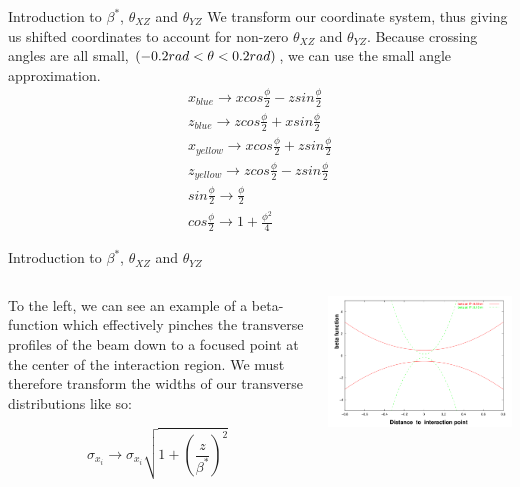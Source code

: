 \begin{frame}{Introduction to $\beta^{*}$,  $\theta_{XZ}$ and $\theta_{YZ}$}
We transform our coordinate system, thus giving us shifted coordinates to
account for non-zero $\theta_{XZ}$ and $\theta_{YZ}$. Because crossing angles
are all small, $\nobreak(-0.2 rad < \theta < 0.2 rad)$, we can use the small angle
approximation.
\begin{gather}
\label{eq:transformations}
x_{blue}   \rightarrow x cos \frac{\phi}{2} - z sin \frac{\phi}{2} \\
z_{blue}   \rightarrow z cos \frac{\phi}{2} + x sin \frac{\phi}{2} \\
x_{yellow} \rightarrow x cos \frac{\phi}{2} + z sin \frac{\phi}{2} \\
z_{yellow} \rightarrow z cos \frac{\phi}{2} - z sin \frac{\phi}{2} \\
sin \frac {\phi}{2} \rightarrow \frac{\phi}{2} \\
cos \frac {\phi}{2} \rightarrow 1 + \frac{\phi^2}{4}
\end{gather}
\end{frame}

\begin{frame}{Introduction to $\beta^{*}$,  $\theta_{XZ}$ and $\theta_{YZ}$}
\begin{columns}[T] %
\begin{column}[T]{5cm} %
To the left, we can see an example of a beta-function which effectively pinches
the transverse profiles of the beam down to a focused point at the center of the
interaction region. We must therefore transform the widths of our transverse
distributions like so:

\begin{equation}
\label{eq:beta_star_transform}
\sigma_{x_i} \rightarrow \sigma_{x_i} \sqrt{1+\left(\frac{z}{\beta^*}\right)^2 }
\end{equation}
\end{column}
\begin{column}[T]{5cm} %
\includegraphics[width=\linewidth,height=\textheight,keepaspectratio]{../HourglassIntro/figs/beta_function.png}
\end{column}
\end{columns}
\end{frame}

